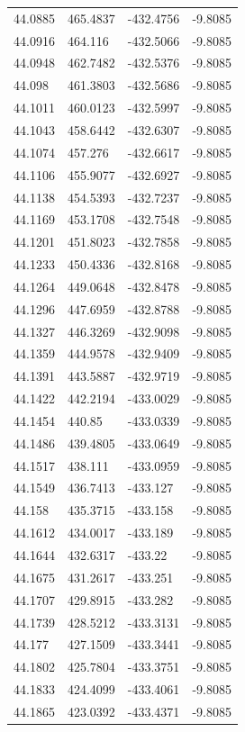 \begin{table}[H]
\begin{tabular}{llll}
44.0885 & 465.4837 & -432.4756 & -9.8085 \\
44.0916 & 464.116 & -432.5066 & -9.8085 \\
44.0948 & 462.7482 & -432.5376 & -9.8085 \\
44.098 & 461.3803 & -432.5686 & -9.8085 \\
44.1011 & 460.0123 & -432.5997 & -9.8085 \\
44.1043 & 458.6442 & -432.6307 & -9.8085 \\
44.1074 & 457.276 & -432.6617 & -9.8085 \\
44.1106 & 455.9077 & -432.6927 & -9.8085 \\
44.1138 & 454.5393 & -432.7237 & -9.8085 \\
44.1169 & 453.1708 & -432.7548 & -9.8085 \\
44.1201 & 451.8023 & -432.7858 & -9.8085 \\
44.1233 & 450.4336 & -432.8168 & -9.8085 \\
44.1264 & 449.0648 & -432.8478 & -9.8085 \\
44.1296 & 447.6959 & -432.8788 & -9.8085 \\
44.1327 & 446.3269 & -432.9098 & -9.8085 \\
44.1359 & 444.9578 & -432.9409 & -9.8085 \\
44.1391 & 443.5887 & -432.9719 & -9.8085 \\
44.1422 & 442.2194 & -433.0029 & -9.8085 \\
44.1454 & 440.85 & -433.0339 & -9.8085 \\
44.1486 & 439.4805 & -433.0649 & -9.8085 \\
44.1517 & 438.111 & -433.0959 & -9.8085 \\
44.1549 & 436.7413 & -433.127 & -9.8085 \\
44.158 & 435.3715 & -433.158 & -9.8085 \\
44.1612 & 434.0017 & -433.189 & -9.8085 \\
44.1644 & 432.6317 & -433.22 & -9.8085 \\
44.1675 & 431.2617 & -433.251 & -9.8085 \\
44.1707 & 429.8915 & -433.282 & -9.8085 \\
44.1739 & 428.5212 & -433.3131 & -9.8085 \\
44.177 & 427.1509 & -433.3441 & -9.8085 \\
44.1802 & 425.7804 & -433.3751 & -9.8085 \\
44.1833 & 424.4099 & -433.4061 & -9.8085 \\
44.1865 & 423.0392 & -433.4371 & -9.8085 \\

\end{tabular}
\end{table}
